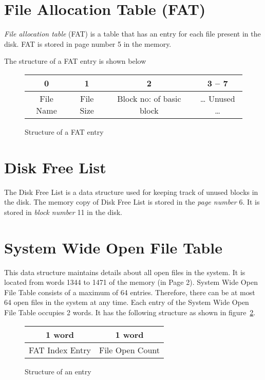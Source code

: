 \documentclass[10pt]{report}
\begin{document}
\section{File Allocation Table (FAT)}
\label{sec:fat}
\emph{File allocation table} (FAT) is a table that has an entry for each file present in the disk. FAT is stored in page number 5 in the memory. \\



The structure of a FAT entry is shown below 

\begin{figure}[htp!] \small
	\centering
	\begin{tabular}{|c|c|c|c|}
		\hline
		0 & 1 & 2 & 3 -- 7 \\
		\hline
		File Name & File Size & Block no: of basic block & \dots{} Unused \dots \\
		\hline
	\end{tabular}
	\caption{Structure of a FAT entry}
	\label{fig:fat_entry}
\end{figure}



\section{Disk Free List}
\label{sec:disk free list}
The Disk Free List is a data structure used for keeping track of unused blocks in the disk. The memory copy of Disk Free List is stored in the \textit{page number} 6. It is stored in \textit{block number} 11 in the disk. 


\section{System Wide Open File Table}
\label{sec:file table}
	
This data structure maintains details about all open files in the system. It is located from words 1344 to 1471 of the memory (in Page 2). System Wide Open File Table consists of a maximum of 64 entries. 
Therefore, there can be at most 64 open files in the system at any time. Each entry of the System Wide Open File Table occupies 2 words. It has the following structure as shown in figure~\ref{fig:file table}.

	 \begin{figure}[h!]
		 \centering
			\begin{tabular}{|c|c|}
				1 word & 1 word	\\		
				\hline
				FAT Index Entry & File Open Count\\
				\hline
			\end{tabular}
		 \caption{Structure of an entry}
		 \label{fig:file table}
	 \end{figure}
\end{document}
